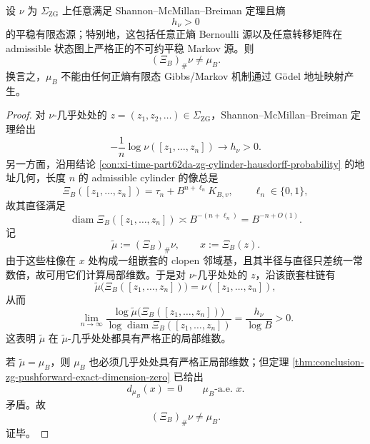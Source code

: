 \begin{theorem}[零维算术推前测度的正熵有限态源障碍]\label{thm:conclusion-zg-positive-entropy-finitestate-obstruction}
设 \(\nu\) 为 \(\Sigma_{\mathrm{ZG}}\) 上任意满足 Shannon--McMillan--Breiman 定理且熵
\[
h_\nu>0
\]
的平稳有限态源；特别地，这包括任意正熵 Bernoulli 源以及任意转移矩阵在 admissible 状态图上严格正的不可约平稳 Markov 源。则
\[
(\Xi_B)_\#\nu\neq \mu_B.
\]
换言之，\(\mu_B\) 不能由任何正熵有限态 Gibbs/Markov 机制通过 Gödel 地址映射产生。
\end{theorem}
\begin{proof}
对 \(\nu\)-几乎处处的 \(z=(z_1,z_2,\dots)\in\Sigma_{\mathrm{ZG}}\)，Shannon--McMillan--Breiman 定理给出
\[
-\frac1n\log \nu([z_1,\dots,z_n])\longrightarrow h_\nu>0.
\]
另一方面，沿用结论 \ref{con:xi-time-part62da-zg-cylinder-hausdorff-probability} 的地址几何，长度 \(n\) 的 admissible cylinder 的像总是
\[
\Xi_B([z_1,\dots,z_n])=\tau_n+B^{n+\ell_n}K_{B,v},
\qquad
\ell_n\in\{0,1\},
\]
故其直径满足
\[
\operatorname{diam}\Xi_B([z_1,\dots,z_n])\asymp B^{-(n+\ell_n)}=B^{-n+O(1)}.
\]
记
\[
\widetilde\mu:=(\Xi_B)_\#\nu,
\qquad
x:=\Xi_B(z).
\]
由于这些柱像在 \(x\) 处构成一组嵌套的 clopen 邻域基，且其半径与直径只差统一常数倍，故可用它们计算局部维数。于是对 \(\nu\)-几乎处处的 \(z\)，沿该嵌套柱链有
\[
\widetilde\mu\bigl(\Xi_B([z_1,\dots,z_n])\bigr)=\nu([z_1,\dots,z_n]),
\]
从而
\[
\lim_{n\to\infty}
\frac{\log \widetilde\mu\bigl(\Xi_B([z_1,\dots,z_n])\bigr)}
{\log \operatorname{diam}\Xi_B([z_1,\dots,z_n])}
=
\frac{h_\nu}{\log B}
>0.
\]
这表明 \(\widetilde\mu\) 在 \(\widetilde\mu\)-几乎处处都具有严格正的局部维数。

若 \(\widetilde\mu=\mu_B\)，则 \(\mu_B\) 也必须几乎处处具有严格正局部维数；但定理 \ref{thm:conclusion-zg-pushforward-exact-dimension-zero} 已给出
\[
d_{\mu_B}(x)=0
\qquad
\mu_B\text{-a.e. }x.
\]
矛盾。故
\[
(\Xi_B)_\#\nu\neq \mu_B.
\]
证毕。
\end{proof}

